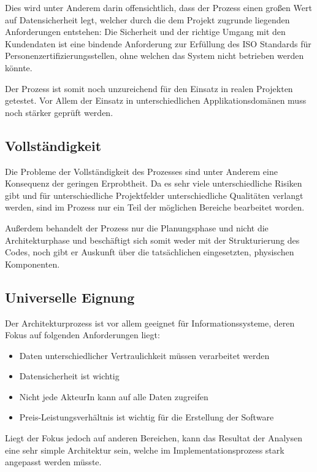Dies wird unter Anderem darin offensichtlich, dass der Prozess einen großen Wert auf Datensicherheit legt, welcher durch die dem Projekt zugrunde liegenden Anforderungen entstehen: Die Sicherheit und der richtige Umgang mit den Kundendaten ist eine bindende Anforderung zur Erfüllung des ISO Standards für Personenzertifizierungsstellen, ohne welchen das System nicht betrieben werden könnte. \cite{ISO_CERT}

Der Prozess ist somit noch unzureichend für den Einsatz in realen Projekten getestet. Vor Allem der Einsatz in unterschiedlichen Applikationsdomänen muss noch stärker geprüft werden.

\subsection{Vollständigkeit}
Die Probleme der Vollständigkeit des Prozesses sind unter Anderem eine Konsequenz der geringen Erprobtheit. Da es sehr viele unterschiedliche Risiken gibt und für unterschiedliche Projektfelder unterschiedliche Qualitäten verlangt werden, sind im Prozess nur ein Teil der möglichen Bereiche bearbeitet worden.

Außerdem behandelt der Prozess nur die Planungsphase und nicht die Architekturphase und beschäftigt sich somit weder mit der Strukturierung des Codes, noch gibt er Auskunft über die tatsächlichen eingesetzten, physischen Komponenten.


\subsection{Universelle Eignung}
Der Architekturprozess ist vor allem geeignet für Informationssysteme, deren Fokus auf folgenden Anforderungen liegt:

\begin{itemize}
  \item Daten unterschiedlicher Vertraulichkeit müssen verarbeitet werden
  \item Datensicherheit ist wichtig
  \item Nicht jede AkteurIn kann auf alle Daten zugreifen
  \item Preis-Leistungsverhältnis ist wichtig für die Erstellung der Software
\end{itemize}

Liegt der Fokus jedoch auf anderen Bereichen, kann das Resultat der Analysen eine sehr simple Architektur sein, welche im Implementationsprozess stark angepasst werden müsste.

